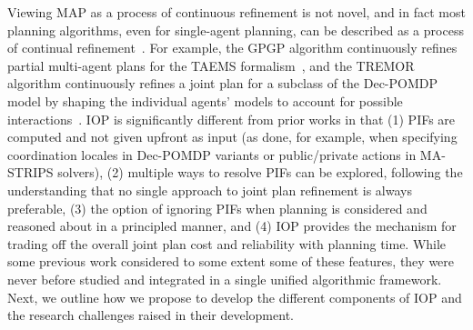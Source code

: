 \documentclass[11pt]{article}
\begin{document}
Viewing MAP as a process of continuous refinement is not novel, and in fact most planning algorithms, even for single-agent planning, can be described as a process of continual refinement~\cite{kambhampati1997refinement,lesser2004evolution,de2005multi,georgeff1988communication}. For example, the GPGP algorithm continuously refines partial multi-agent plans for the TAEMS formalism~\cite{lesser2004evolution}, and the TREMOR algorithm continuously refines a joint plan for a subclass of the Dec-POMDP model by shaping the individual agents' models to account for possible interactions~\cite{varakantham2009exploiting}. 
IOP is significantly different from prior works in that 
(1) PIFs are computed and not given upfront as input (as done, for example, when specifying coordination locales in Dec-POMDP variants or public/private actions in MA-STRIPS solvers),
(2) multiple ways to resolve PIFs can be explored, following the understanding that no single approach to joint plan refinement is always preferable,
(3) the option of ignoring PIFs when planning is considered and reasoned about in a principled manner, and (4) IOP provides the mechanism for trading off the overall joint plan cost and reliability with planning time. 
While some previous work considered to some extent some of these features, they were never before studied and integrated in a single unified algorithmic framework. Next, we outline how we propose to develop the different components of IOP and the research challenges raised in their development. 

\end{document}
